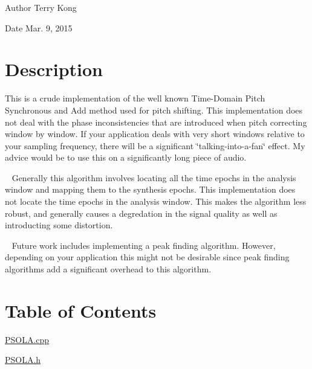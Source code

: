 \begin{DoxyAuthor}{Author}
Terry Kong 
\end{DoxyAuthor}
\begin{DoxyDate}{Date}
Mar. 9, 2015
\end{DoxyDate}
\hypertarget{index_desc_sec}{}\section{Description}\label{index_desc_sec}
This is a crude implementation of the well known Time-\/\+Domain Pitch Synchronous and Add method used for pitch shifting. This implementation does not deal with the phase inconsistencies that are introduced when pitch correcting window by window. If your application deals with very short windows relative to your sampling frequency, there will be a significant \char`\"{}talking-\/into-\/a-\/fan\char`\"{} effect. My advice would be to use this on a significantly long piece of audio.

~\newline
 Generally this algorithm involves locating all the time epochs in the analysis window and mapping them to the synthesis epochs. This implementation does not locate the time epochs in the analysis window. This makes the algorithm less robust, and generally causes a degredation in the signal quality as well as introducting some distortion.

~\newline
 Future work includes implementing a peak finding algorithm. However, depending on your application this might not be desirable since peak finding algorithms add a significant overhead to this algorithm.\hypertarget{index_contents_sec}{}\section{Table of Contents}\label{index_contents_sec}
\hyperlink{_p_s_o_l_a_8cpp}{P\+S\+O\+L\+A.\+cpp}

\hyperlink{_p_s_o_l_a_8h}{P\+S\+O\+L\+A.\+h} 
